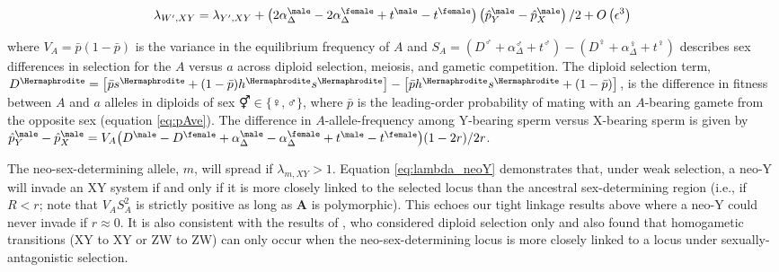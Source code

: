 \documentclass[12pt]{article}
\begin{document}
\begin{equation}
\lambda_{W',XY} =\lambda_{Y',XY}+\left(2\alpha_{\Delta}^\male-2\alpha_{\Delta}^\female+t^\male-t^\female \right) \left( \hat{p}^\male_Y-\hat{p}^\male_X \right)/2
+O\left(\epsilon^3 \right) \\
\label{eq:lambda_neoW}
\end{equation}

\noindent
where $V_{A}=\bar{p}(1-\bar{p})$ is the variance in the equilibrium frequency of $A$ and $S_{A}=(D^\male +\alpha_{\Delta}^\male+t^\male) - (D^\female+\alpha_{\Delta}^\female+t^\female)$ describes sex differences in selection for the $A$ versus $a$ across diploid selection, meiosis, and gametic competition.
The diploid selection term, $D^\Hermaphrodite=\big{[} \bar{p}s^\Hermaphrodite+(1-\bar{p})h^\Hermaphrodite s^\Hermaphrodite\big{]} -\big{[} \bar{p}h^\Hermaphrodite s^\Hermaphrodite+(1-\bar{p}) \big{]}$, is the difference in fitness between $A$ and $a$ alleles in diploids of sex $\Hermaphrodite \in \{\female,\male\}$, where $\bar{p}$ is the leading-order probability of mating with an $A$-bearing gamete from the opposite sex (equation \ref{eq:pAve}). 
The difference in $A$-allele-frequency among Y-bearing sperm versus X-bearing sperm is given by $\hat{p}^\male_Y-\hat{p}^\male_X=V_{A}\big{(}D^\male - D^\female+\alpha_{\Delta}^\male-\alpha_{\Delta}^\female+t^\male-t^\female\big{)}(1-2r)/2r$. 


The neo-sex-determining allele, $m$, will spread if $\lambda_{m,XY}>1$. 
Equation \eqref{eq:lambda_neoY} demonstrates that, under weak selection, a neo-Y will invade an XY system if and only if it is more closely linked to the selected locus than the ancestral sex-determining region (i.e., if $R<r$; note that $V_{A}S_{A}^2$ is strictly positive as long as \textbf{A} is polymorphic). 
This echoes our tight linkage results above where a neo-Y could never invade if $r\approx0$. It is also consistent with the results of \citet{vanDoorn:2007eu}, who considered diploid selection only and also found that homogametic transitions (XY to XY or ZW to ZW) can only occur when the neo-sex-determining locus is more closely linked to a locus under sexually-antagonistic selection. 
\end{document}
